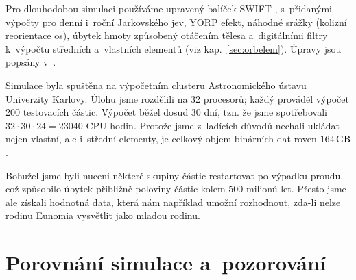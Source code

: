 \documentclass[A4paper, 12pt, oneside, openany]{book}
\begin{document}
Pro dlouhodobou simulaci používáme upravený balíček SWIFT \cite{levison94}, s~přidanými výpočty pro denní i~roční Jarkovského jev, YORP efekt, náhodné srážky (kolizní reorientace os), úbytek hmoty způsobený otáčením tělesa a~digitálními filtry k~výpočtu středních a~vlastních elementů (viz kap.~\ref{sec:orbelem}). Úpravy jsou popsány v~\cite{broz11}.

Simulace byla spuštěna na výpočetním clusteru Astronomického ústavu Univerzity Karlovy. Úlohu jsme rozdělili na 32 procesorů; každý prováděl výpočet 200 testovacích částic. Výpočet běžel dosud 30 dní, tzn. že jsme spotřebovali $32\cdot30\cdot24=23040$ CPU hodin. Protože jsme z~ladících důvodů nechali ukládat nejen vlastní, ale i~střední elementy, je celkový objem binárních dat roven $164\,{\rm GB}$.

Bohužel jsme byli nuceni některé skupiny částic restartovat po výpadku proudu, což způsobilo úbytek přibližně poloviny částic kolem $500$ milionů let. Přesto jsme ale získali hodnotná data, která nám například umožní rozhodnout, zda-li nelze rodinu Eunomia vysvětlit jako mladou rodinu.

\newpage
\section{Porovnání simulace a~pozorování}
\end{document}
